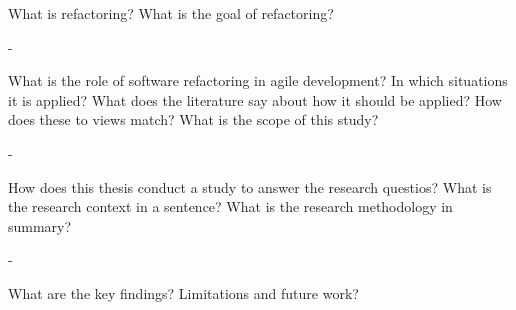 \documentclass[english,12pt,a4paper,pdftex,sci,utf8]{aaltothesis}
\begin{document}

\date{31.03.2015}




\makecoverpage



\begin{abstractpage}[english]
What is refactoring? What is the goal of refactoring?

-

What is the role of software refactoring in agile development? In which situations it is applied? What does the literature say about how it should be applied? How does these to views match? What is the scope of this study?

-

How does this thesis conduct a study to answer the research questios? What is the research context in a sentence? What is the research methodology in summary?

-

What are the key findings? Limitations and future work?
\end{abstractpage}
\end{document}
